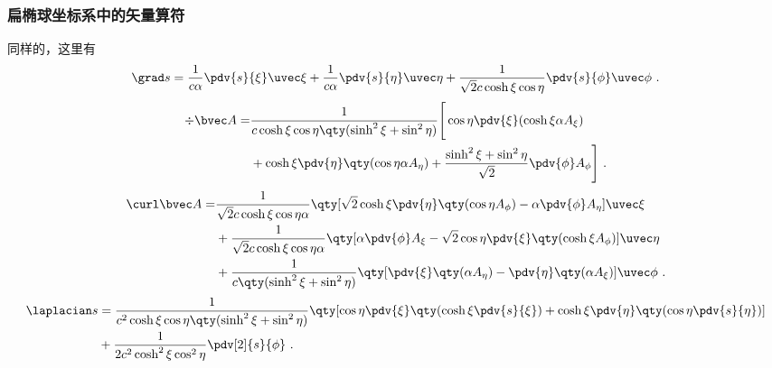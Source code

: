 \subsubsection{扁椭球坐标系中的矢量算符}
同样的，这里有
\begin{equation}
\grad s = \frac{1}{c\alpha} \pdv{s}{\xi}\uvec \xi + \frac{1}{c\alpha}\pdv{s}{\eta} \uvec \eta +  \frac{1}{\sqrt{2}c\cosh\xi\cos\eta}\pdv{s}{\phi}\uvec \phi~.
\end{equation}
\begin{equation}
\begin{aligned}
\div \bvec A = &\frac{1}{c\cosh\xi\cos\eta\qty(\sinh^2\xi+\sin^2\eta)}\Bigg[\cos\eta\pdv{\xi}(\cosh\xi\alpha A_\xi) \\&+ \cosh\xi\pdv{\eta}\qty(\cos\eta\alpha A_\eta) + \frac{\sinh^2\xi+\sin^2\eta}{\sqrt{2}}\pdv{\phi}A_\phi\Bigg]~.
\end{aligned}
\end{equation}
\begin{equation}
\begin{aligned}
\curl \bvec A =& \frac{1}{\sqrt{2}c\cosh\xi\cos\eta\alpha}\qty[\sqrt{2}\cosh\xi\pdv{\eta}\qty(\cos\eta
A_\phi) - \alpha\pdv{\phi}A_\eta]\uvec \xi\\
&+ \frac{1}{\sqrt{2}c\cosh\xi\cos\eta\alpha}\qty[\alpha\pdv{\phi}A_\xi - \sqrt{2}\cos\eta\pdv{\xi}\qty(\cosh\xi
A_\phi)]\uvec \eta
 \\
&+\frac{1}{c\qty(\sinh^2\xi+\sin^2\eta)}\qty[\pdv{\xi}\qty(\alpha A_\eta) - \pdv{\eta}\qty(\alpha A_\xi)]\uvec \phi~.
\end{aligned}
\end{equation}
\begin{equation}
\begin{aligned}
\laplacian s &= \frac{1}{c^2\cosh\xi\cos\eta\qty(\sinh^2\xi+\sin^2\eta)}\qty[\cos\eta\pdv{\xi}\qty(\cosh\xi\pdv{s}{\xi}) + \cosh\xi\pdv{\eta}\qty(\cos\eta\pdv{s}{\eta})]\\
&+ \frac{1}{2c^2\cosh^2\xi\cos^2\eta }\pdv[2]{s}{\phi}~.
\end{aligned}
\end{equation}

